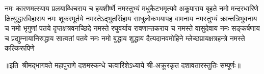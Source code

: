 
\twolineshloka
{नमः कारणमत्स्याय प्रलयाब्धिचराय च}
{हयशीर्ष्णे नमस्तुभ्यं मधुकैटभमृत्यवे}%
\twolineshloka
{अकूपाराय बृहते नमो मन्दरधारिणे}
{क्षित्युद्धारविहाराय नमः शूकरमूर्तये}%
\twolineshloka
{नमस्तेऽद्भुतसिंहाय साधुलोकभयापह}
{वामनाय नमस्तुभ्यं क्रान्तत्रिभुवनाय च}%
\twolineshloka
{नमो भृगुणां पतये दृप्तक्षत्रवनच्छिदे}
{नमस्ते रघुवर्याय रावणान्तकराय च}%
\twolineshloka
{नमस्ते वासुदेवाय नमः सङ्कर्षणाय च}
{प्रद्युम्नायानिरुद्धाय सात्वतां पतये नमः}%
\twolineshloka
{नमो बुद्धाय शुद्धाय दैत्यदानवमोहिने}
{म्लेच्छप्रायक्षत्रहन्त्रे नमस्ते कल्किरूपिणे}%

॥इति~श्रीमद्भागवते महापुराणे दशमस्कन्धे चत्वारिंशेऽध्याये श्री-अक्रूरकृत दशावतारस्तुतिः सम्पूर्णः॥ 
%
%
%
%

